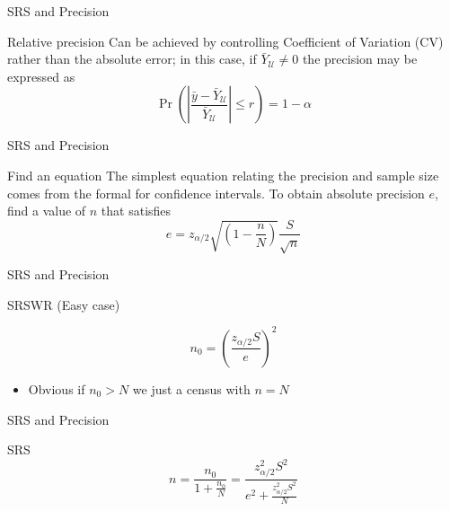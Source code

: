 \documentclass[10pt]{beamer}\usepackage[]{graphicx}\usepackage[]{xcolor}
\begin{document}
\begin{frame}{SRS and Precision}

\begin{block}{Relative precision}
Can be achieved by controlling Coefficient of Variation (CV) rather than the absolute error; in this case, if $\bar{Y}_{\mathcal{U}} \neq 0$ the precision may be expressed as 
$$\Pr\left(\left| \frac{\bar{y}-\bar{Y}_{\mathcal{U}}}{\bar{Y}_{\mathcal{U}}}\right| \leq r \right) = 1-\alpha$$
\end{block}

\end{frame}


\begin{frame}{SRS and Precision}

\begin{block}{Find an equation}
The simplest equation relating the precision and sample size comes from the formal for confidence intervals. To obtain absolute precision $e$, find a value of $n$ that satisfies
$$e=z_{\alpha/2}\sqrt{(1-\frac{n}{N})}\frac{S}{\sqrt{n}}$$
\end{block}
\end{frame}


\begin{frame}{SRS and Precision}

\begin{block}{SRSWR (Easy case)}

$$n_0 = \left(\frac{z_{\alpha/2}S}{e}\right)^2$$

\end{block}

\begin{itemize}
\item Obvious if $n_0>N$ we just a census with $n=N$
\end{itemize}

\end{frame}


\begin{frame}{SRS and Precision}

\begin{block}{SRS}
$$n = \frac{n_0}{1+\frac{n_0}{N}} = \frac{z_{\alpha/2}^2S^2}{e^2+\frac{z_{\alpha/2}^2S^2}{N}}$$
\end{block}

\end{frame}
\end{document}
